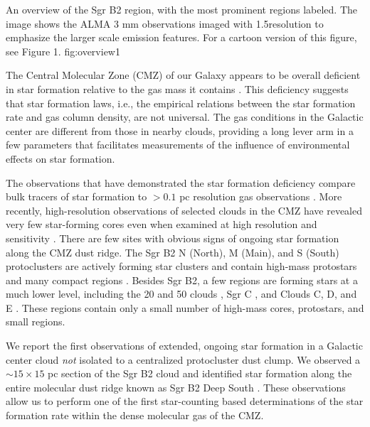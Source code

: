 \documentclass[twocolumn]{aastex61}
\begin{document}
{An overview of the Sgr B2 region, with the most prominent regions labeled.
The image shows the ALMA 3 mm observations imaged with 1.5\arcsec resolution
to emphasize the larger scale emission features.  For a cartoon version of this
figure, see \citet{Schmiedeke2016a} Figure 1.}
{fig:overview}{1}{\textwidth}

The Central Molecular Zone (CMZ) of our Galaxy appears to be overall deficient
in star formation relative to the gas mass it contains
\citep{Beuther2012a,Immer2012a,Longmore2013a,
Kauffmann2016a,Kauffmann2016b,Barnes2016c,Barnes2017b}.  This deficiency
suggests that star formation laws, i.e., the empirical relations between
the star formation rate and gas column density, are not universal.  The gas
conditions in the Galactic center are different from those in nearby clouds,
providing a long lever arm in a few
parameters \citep[e.g., pressure, temperature, velocity
dispersion;
][]{Kruijssen2013a,Ginsburg2016a,Immer2016a,Shetty2012a,Henshaw2016a} that
facilitates measurements of the influence of environmental effects on star
formation.


The observations that have demonstrated the star formation deficiency compare
bulk tracers of star formation to $>0.1$ pc resolution gas observations
\citep[e.g.][]{Barnes2017b}.  More recently, high-resolution observations
of selected clouds in the CMZ have revealed very few star-forming cores
even when examined at high resolution and sensitivity
\citep{Johnston2014a,Rathborne2014a,Rathborne2015a,Kauffmann2016a,Kauffmann2016b}.
There are 
few sites with obvious signs of ongoing star formation along the CMZ dust ridge.
The Sgr B2
N (North), M (Main), and S (South) protoclusters \citep[][Figure
\ref{fig:overview}]{Schmiedeke2016a} are actively  forming star clusters
and contain high-mass protostars and many compact \hii regions
\citep[e.g.][]{Higuchi2015a,Gaume1995a}. 
Besides Sgr B2, a few regions are forming stars at a much lower level,
including the 20 \kms and 50 \kms clouds \citep{Lu2015b,Lu2016a,2017a},
Sgr C \citep{Kendrew2013a},
and
Clouds C, D, and E \citep[][Walker et al, in
prep;]{Ginsburg2015b,Barnes2017b}.  These regions contain only a small number
of high-mass cores, protostars, and small \hii regions.

We report the first observations of extended, ongoing star formation in a
Galactic center cloud \emph{not} isolated to a centralized protocluster dust
clump.  We observed a $\sim15\times15$ pc section of the Sgr B2 cloud and
identified star formation along the entire molecular dust ridge known as Sgr B2
Deep South \citep[DS, also known as the `Southern
Complex'][]{Jones2012a,Schmiedeke2016a}.  These observations allow us to
perform one of the first star-counting based determinations of the star
formation rate within the dense molecular gas of the CMZ.
\end{document}
